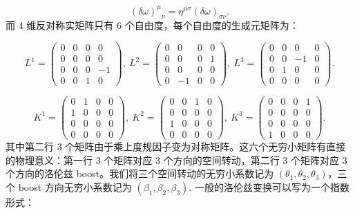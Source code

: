 \documentclass[10pt,UTF8]{ctexart}
\begin{document}
\begin{equation}
{\left(\delta\omega\right)^{\mu}}_{\nu}=\eta^{\mu\sigma}\left(\delta\omega\right)_{\sigma\nu}.
\end{equation}
而 4 维反对称实矩阵只有 6 个自由度，每个自由度的生成元矩阵为：

\begin{equation}
L^{1}=\left(\begin{array}{cccc}
0 & 0 & 0 & 0\\
0 & 0 & 0 & 0\\
0 & 0 & 0 & -1\\
0 & 0 & 1 & 0
\end{array}\right),\ L^{2}=\left(\begin{array}{cccc}
0 & 0 & 0 & 0\\
0 & 0 & 0 & 1\\
0 & 0 & 0 & 0\\
0 & -1 & 0 & 0
\end{array}\right),\ L^{3}=\left(\begin{array}{cccc}
0 & 0 & 0 & 0\\
0 & 0 & -1 & 0\\
0 & 1 & 0 & 0\\
0 & 0 & 0 & 0
\end{array}\right).
\end{equation}

\begin{equation}
K^{1}=\left(\begin{array}{cccc}
0 & 1 & 0 & 0\\
1 & 0 & 0 & 0\\
0 & 0 & 0 & 0\\
0 & 0 & 0 & 0
\end{array}\right),\ K^{2}=\left(\begin{array}{cccc}
0 & 0 & 1 & 0\\
0 & 0 & 0 & 0\\
1 & 0 & 0 & 0\\
0 & 0 & 0 & 0
\end{array}\right),\ K^{3}=\left(\begin{array}{cccc}
0 & 0 & 0 & 1\\
0 & 0 & 0 & 0\\
0 & 0 & 0 & 0\\
1 & 0 & 0 & 0
\end{array}\right).
\end{equation}
其中第二行 3 个矩阵由于乘上度规因子变为对称矩阵。这六个无穷小矩阵有直接的物理意义：第一行 3 个矩阵对应 3 个方向的空间转动，第二行
3 个矩阵对应 3 个方向的洛伦兹 boost。我们将三个空间转动的无穷小系数记为 $\left(\theta_{1},\theta_{2},\theta_{3}\right)$，三个
boost 方向无穷小系数记为 $\left(\beta_{1},\beta_{2},\beta_{3}\right)$. 一般的洛伦兹变换可以写为一个指数形式：
\end{document}
